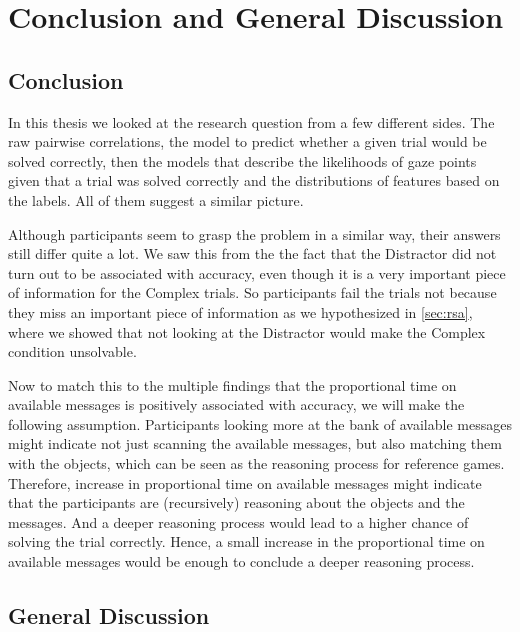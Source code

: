 ﻿\chapter{Conclusion and General Discussion}
\label{chap:conclusion}

\section{Conclusion}
\label{sec:conclusion}

In this thesis we looked at the research question from a few different sides. The raw pairwise correlations, the model to predict whether a given trial would be solved correctly, then the models that describe the likelihoods of gaze points given that a trial was solved correctly and the distributions of features based on the labels. All of them suggest a similar picture. 

Although participants seem to grasp the problem in a similar way, their answers still differ quite a lot. We saw this from the the fact that the Distractor did not turn out to be associated with accuracy, even though it is a very important piece of information for the Complex trials. So participants fail the trials not because they miss an important piece of information as we hypothesized in \autoref{sec:rsa}, where we showed that not looking at the Distractor would make the Complex condition unsolvable. 

Now to match this to the multiple findings that the proportional time on available messages is positively associated with accuracy, we will make the following assumption. Participants looking more at the bank of available messages might indicate not just scanning the available messages, but also matching them with the objects, which can be seen as the reasoning process for reference games. Therefore, increase in proportional time on available messages might indicate that the participants are (recursively) reasoning about the objects and the messages. And a deeper reasoning process would lead to a higher chance of solving the trial correctly. Hence, a small increase in the proportional time on available messages would be enough to conclude a deeper reasoning process.



\section{General Discussion}
\label{sec:general-discussion}

